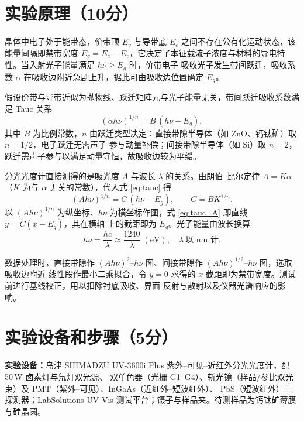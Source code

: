 \documentclass[12pt,a4paper]{ctexart}
\begin{document}
\section*{实验原理（10分）}

晶体中电子处于能带态，价带顶 $E_v$ 与导带底 $E_c$ 之间不存在公有化运动状态，该能量间隔即禁带宽度
$E_g=E_c-E_v$，它决定了本征载流子浓度与材料的导电特性。当入射光子能量满足 $h\nu \ge E_g$ 时，价带电子
吸收光子发生带间跃迁，吸收系数 $\alpha$ 在吸收边附近急剧上升，据此可由吸收边位置确定 $E_g$。

假设价带与导带近似为抛物线、跃迁矩阵元与光子能量无关，带间跃迁吸收系数满足 Tauc 关系
\begin{equation}
  (\alpha h\nu)^{1/n}=B\,(h\nu-E_g),
  \label{eq:tauc}
\end{equation}
其中 $B$ 为比例常数，$n$ 由跃迁类型决定：直接带隙半导体（如 ZnO、钙钛矿）取 $n=1/2$，电子跃迁无需声子
参与动量补偿；间接带隙半导体（如 Si）取 $n=2$，跃迁需声子参与以满足动量守恒，故吸收边较为平缓。

分光光度计直接测得的是吸光度 $A$ 与波长 $\lambda$ 的关系。由朗伯--比尔定律 $A=K\alpha$（$K$ 为与
$\alpha$ 无关的常数），代入式 \eqref{eq:tauc} 得
\begin{equation}
  (A h\nu)^{1/n}=C\,(h\nu-E_g),\qquad C=BK^{1/n}.
  \label{eq:tauc_A}
\end{equation}
以 $(A h\nu)^{1/n}$ 为纵坐标、$h\nu$ 为横坐标作图，式 \eqref{eq:tauc_A} 即直线 $y=C(x-E_g)$，其在横轴
上的截距即为 $E_g$。光子能量由波长换算
\begin{equation}
  h\nu=\frac{hc}{\lambda}\approx \frac{1240}{\lambda}\;(\mathrm{eV}),\quad \lambda\ \text{以 nm 计}.
\end{equation}

数据处理时，直接带隙作 $(A h\nu)^2$--$h\nu$ 图、间接带隙作 $(A h\nu)^{1/2}$--$h\nu$ 图，选取吸收边附近
线性段作最小二乘拟合，令 $y=0$ 求得的 $x$ 截距即为禁带宽度。测试前进行基线校正，用以扣除衬底吸收、界面
反射与散射以及仪器光谱响应的影响。

\section*{实验设备和步骤（5分）}

\textbf{实验设备：}岛津 SHIMADZU UV-3600i Plus 紫外--可见--近红外分光光度计，配 50\,W 卤素灯与氘灯双光源、
双单色器（光栅 G1--G4）、斩光镜（样品/参比双光束）及 PMT（紫外--可见）、InGaAs（近红外--短波红外）、
PbS（短波红外）三探测器；LabSolutions UV-Vis 测试平台；镊子与样品夹。待测样品为钙钛矿薄膜与硅晶圆。
\end{document}
